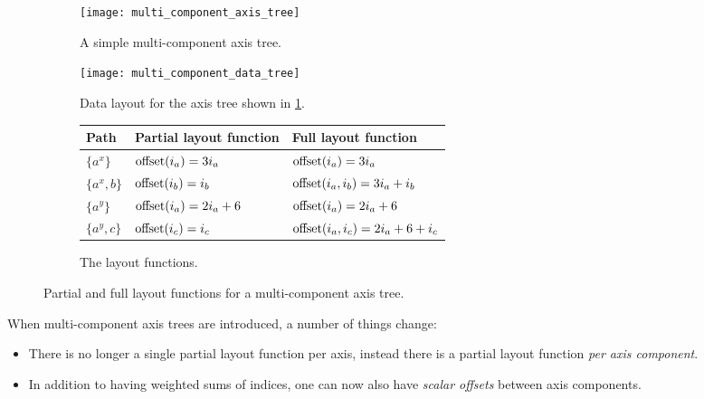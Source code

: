 \documentclass[thesis]{subfiles}
\begin{document}

\begin{figure}
  \centering
  \begin{subfigure}{.4\textwidth}
    \centering
    \texttt{[image: multi\_component\_axis\_tree]}
    \caption{A simple multi-component axis tree.}
    \label{fig:multi_component_axis_tree}
  \end{subfigure}
  \begin{subfigure}{.5\textwidth}
    \centering
    \texttt{[image: multi\_component\_data\_tree]}
    \caption{Data layout for the axis tree shown in \cref{fig:multi_component_axis_tree}.}
  \end{subfigure}

  \vspace{1em}

  \begin{subfigure}{\textwidth}
    \centering
    \begin{tabular}{|l|l|l|}
      \hline
      \textbf{Path} & \textbf{Partial layout function} & \textbf{Full layout function} \\
      \hline
      $\{ a^x \}$ & $\textnormal{offset}(i_a) = 3 i_a$ & $\textnormal{offset}(i_a) = 3 i_a$ \\
      \hline
      $\{ a^x, b \}$ & $\textnormal{offset}(i_b) = i_b$ & $\textnormal{offset}(i_a, i_b) = 3 i_a + i_b$ \\
      \hline
      $\{ a^y \}$ & $\textnormal{offset}(i_a) = 2 i_a + 6$ & $\textnormal{offset}(i_a) = 2 i_a + 6$ \\
      \hline
      $\{ a^y, c \}$ & $\textnormal{offset}(i_c) = i_c$ & $\textnormal{offset}(i_a, i_c) = 2 i_a + 6 + i_c$ \\
      \hline
    \end{tabular}
    \caption{
      The layout functions.
    }
    \label{fig:multi_component_layouts}
  \end{subfigure}

  \caption{Partial and full layout functions for a multi-component axis tree.}
  \label{fig:multi_component_axis_tree_all}
\end{figure}

When multi-component axis trees are introduced, a number of things change:

\begin{itemize}
  \item
    There is no longer a single partial layout function per axis, instead there is a partial layout function \textit{per axis component}.

  \item
    In addition to having weighted sums of indices, one can now also have \textit{scalar offsets} between axis components.
\end{itemize}
\end{document}
